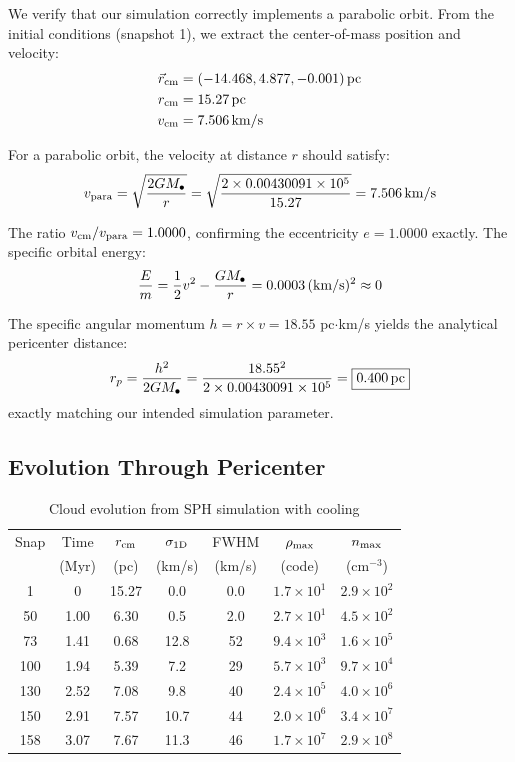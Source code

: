 \documentclass[twocolumn,amsmath,amssymb,prd,superscriptaddress,nofootinbib]{revtex4-2}
\begin{document}
We verify that our simulation correctly implements a parabolic orbit. From the initial conditions (snapshot 1), we extract the center-of-mass position and velocity:
\begin{align}
    \vec{r}_{\rm cm} &= (-14.468, 4.877, -0.001)\,{\rm pc} \\
    r_{\rm cm} &= 15.27\,{\rm pc} \\
    v_{\rm cm} &= 7.506\,{\rm km/s}
\end{align}

For a parabolic orbit, the velocity at distance $r$ should satisfy:
\begin{equation}
    v_{\rm para} = \sqrt{\frac{2GM_\bullet}{r}} = \sqrt{\frac{2 \times 0.00430091 \times 10^5}{15.27}} = 7.506\,{\rm km/s}
\end{equation}

The ratio $v_{\rm cm}/v_{\rm para} = 1.0000$, confirming the eccentricity $e = 1.0000$ exactly. The specific orbital energy:
\begin{equation}
    \frac{E}{m} = \frac{1}{2}v^2 - \frac{GM_\bullet}{r} = 0.0003\,({\rm km/s})^2 \approx 0
\end{equation}

The specific angular momentum $h = r \times v = 18.55$ pc$\cdot$km/s yields the analytical pericenter distance:
\begin{equation}
    r_p = \frac{h^2}{2GM_\bullet} = \frac{18.55^2}{2 \times 0.00430091 \times 10^5} = \boxed{0.400\,{\rm pc}}
\end{equation}
exactly matching our intended simulation parameter.

\subsection{Evolution Through Pericenter}
\label{sec:evolution}

\begin{table}[h]
\centering
\caption{Cloud evolution from SPH simulation with cooling}
\label{tab:evolution}
\begin{tabular}{ccccccc}
\toprule
Snap & Time & $r_{\rm cm}$ & $\sigma_{\rm 1D}$ & FWHM & $\rho_{\rm max}$ & $n_{\rm max}$ \\
 & (Myr) & (pc) & (km/s) & (km/s) & (code) & (cm$^{-3}$) \\
\midrule
1 & 0 & 15.27 & 0.0 & 0.0 & $1.7\times 10^1$ & $2.9\times 10^2$ \\
50 & 1.00 & 6.30 & 0.5 & 2.0 & $2.7\times 10^1$ & $4.5\times 10^2$ \\
73 & 1.41 & 0.68 & 12.8 & 52 & $9.4\times 10^3$ & $1.6\times 10^5$ \\
100 & 1.94 & 5.39 & 7.2 & 29 & $5.7\times 10^3$ & $9.7\times 10^4$ \\
130 & 2.52 & 7.08 & 9.8 & 40 & $2.4\times 10^5$ & $4.0\times 10^6$ \\
150 & 2.91 & 7.57 & 10.7 & 44 & $2.0\times 10^6$ & $3.4\times 10^7$ \\
158 & 3.07 & 7.67 & 11.3 & 46 & $1.7\times 10^7$ & $2.9\times 10^8$ \\
\bottomrule
\end{tabular}
\end{table}
\end{document}

